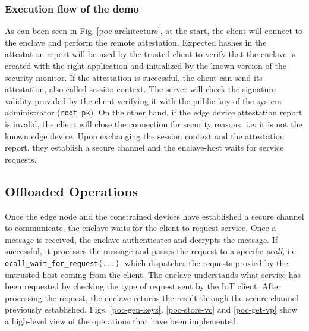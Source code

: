 \subsubsection{Execution flow of the demo}
As can been seen in Fig. \ref{poc-architecture}, at the start, the client will connect to the enclave and perform the remote attestation. Expected hashes in the attestation report will be used by the trusted client to verify that the enclave is created with the right application and initialized by the known version of the security monitor. If the attestation is successful, the client can send its attestation, also called session context. The server will check the signature validity provided by the client verifying it with the public key of the system administrator (\texttt{root\_pk}). On the other hand, if the edge device attestation report is invalid, the client will close the connection for security reasons, i.e. it is not the known edge device.
Upon exchanging the session context and the attestation report, they establish a secure channel and the enclave-host waits for service requests.

\subsection{Offloaded Operations}
Once the edge node and the constrained devices have established a secure channel to communicate, the enclave waits for the client to request service. Once a message is received, the enclave authenticates and decrypts the message. 
If successful, it processes the message and passes the request to a specific \textit{ocall}, i.e \texttt{ocall\_wait\_for\_request(...)}, which dispatches the requests proxied by the untrusted host coming from the client. 
The enclave understands what service has been requested by checking the type of request sent by the IoT client.
After processing the request, the enclave returns the result through the secure channel previously established. Figs. \ref{poc-gen-keys}, \ref{poc-store-vc} and \ref{poc-get-vp} show a high-level view of the operations that have been implemented. 

